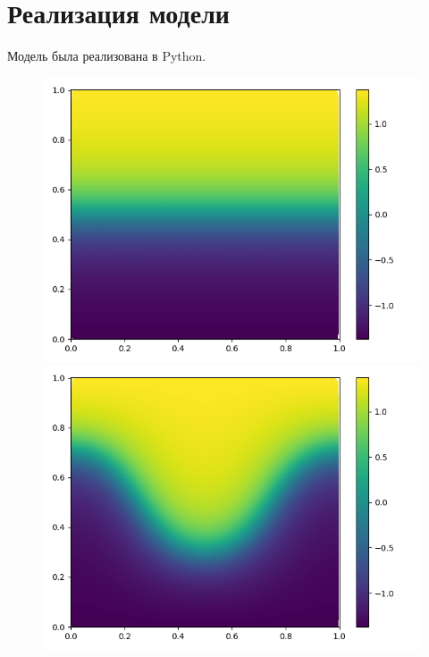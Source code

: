\documentclass[a4paper, 14pt]{extarticle}
\begin{document}
	\section{Реализация модели}
		Модель была реализована в Python.
		\begin{figure}[H]
			\begin{minipage}{0.5\textwidth}
				\centering
				\includegraphics[width = \linewidth]{1.png}
			\end{minipage}\hfill
			\begin{minipage}{0.5\textwidth}
				\centering
				\includegraphics[width = \linewidth]{2.png}
			\end{minipage}\hfill
		\end{figure}
	
\end{document}
